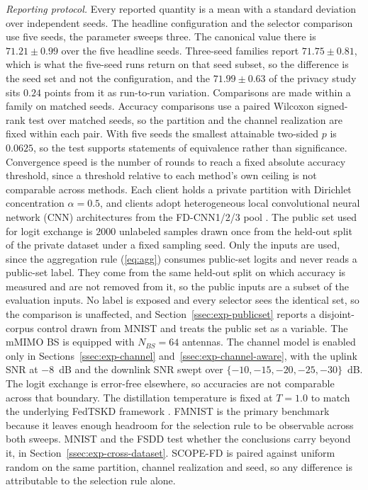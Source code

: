 \documentclass[journal]{IEEEtran}
\newcommand{\rev}[1]{{\color{blue}#1}}
\begin{document}
\rev{\textit{Reporting protocol.} Every reported quantity is a mean with a standard deviation over independent seeds. The headline configuration and the selector comparison use five seeds, the parameter sweeps three. \rev{The canonical value there is $71.21 \pm 0.99$ over the five headline seeds. Three-seed families report $71.75 \pm 0.81$, which is what the five-seed runs return on that seed subset, so the difference is the seed set and not the configuration, and the $71.99 \pm 0.63$ of the privacy study sits $0.24$ points from it as run-to-run variation. Comparisons are made within a family on matched seeds.} Accuracy comparisons use a paired Wilcoxon signed-rank test over matched seeds, so the partition and the channel realization are fixed within each pair. \rev{With five seeds the smallest attainable two-sided $p$ is $0.0625$, so the test supports statements of equivalence rather than significance.} Convergence speed is the number of rounds to reach a fixed absolute accuracy threshold, since a threshold relative to each method's own ceiling is not comparable across methods.} Each client holds a private partition with Dirichlet concentration $\alpha = 0.5$, and clients adopt heterogeneous local convolutional neural network (CNN) architectures from the FD-CNN1/2/3 pool \cite{chan2021fedhe}. \rev{The public set used for logit exchange \cite{itahara2023distillation} is $2000$ unlabeled samples drawn once from the held-out split of the private dataset under a fixed sampling seed. Only the inputs are used, since the aggregation rule (\ref{eq:agg}) consumes public-set logits and never reads a public-set label. \rev{They come from the same held-out split on which accuracy is measured and are not removed from it, so the public inputs are a subset of the evaluation inputs. No label is exposed and every selector sees the identical set, so the comparison is unaffected, and Section~\ref{ssec:exp-publicset} reports a disjoint-corpus control drawn from MNIST and treats the public set as a variable.}} The mMIMO BS is equipped with $N_{BS} = 64$ antennas. \rev{The channel model is enabled only in Sections~\ref{ssec:exp-channel} and~\ref{ssec:exp-channel-aware}, with the uplink SNR at $-8$~dB and the downlink SNR swept over $\{-10,-15,-20,-25,-30\}$~dB. The logit exchange is error-free elsewhere, so accuracies are not comparable across that boundary.} The distillation temperature is fixed at $T = 1.0$ to match the underlying FedTSKD framework \cite{mu2024fedtskd}.
FMNIST is the primary benchmark because it leaves enough headroom for the selection rule to be observable across both sweeps. \rev{MNIST and the FSDD test whether the conclusions carry beyond it, in Section~\ref{ssec:exp-cross-dataset}.}
SCOPE-FD is paired against uniform random on the same partition, channel realization and seed, so any difference is attributable to the selection rule alone. %
\end{document}
